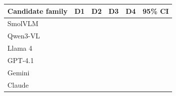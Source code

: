 \begin{tabularx}{\linewidth}{Xrrrrr}
\toprule
Candidate family & D1 & D2 & D3 & D4 & 95\% CI\\\midrule
SmolVLM &  &  &  &  & \\
Qwen3-VL &  &  &  &  & \\
Llama 4 &  &  &  &  & \\
GPT-4.1 &  &  &  &  & \\
Gemini &  &  &  &  & \\
Claude &  &  &  &  & \\
\bottomrule
\end{tabularx}
